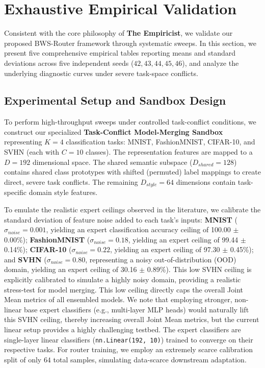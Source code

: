 \section{Exhaustive Empirical Validation}
\label{sec:experiments}

Consistent with the core philosophy of \textbf{The Empiricist}, we validate our proposed BWS-Router framework through systematic sweeps. In this section, we present five comprehensive empirical tables reporting means and standard deviations across five independent seeds ($42, 43, 44, 45, 46$), and analyze the underlying diagnostic curves under severe task-space conflicts.

\subsection{Experimental Setup and Sandbox Design}
To perform high-throughput sweeps under controlled task-conflict conditions, we construct our specialized \textbf{Task-Conflict Model-Merging Sandbox} representing $K=4$ classification tasks: MNIST, FashionMNIST, CIFAR-10, and SVHN (each with $C=10$ classes). The representation features are mapped to a $D=192$ dimensional space. The shared semantic subspace ($D_{shared} = 128$) contains shared class prototypes with shifted (permuted) label mappings to create direct, severe task conflicts. The remaining $D_{style} = 64$ dimensions contain task-specific domain style features.

To emulate the realistic expert ceilings observed in the literature, we calibrate the standard deviation of feature noise added to each task's inputs: \textbf{MNIST} ($\sigma_{noise} = 0.001$, yielding an expert classification accuracy ceiling of 100.00 $\pm$ 0.00\%); \textbf{FashionMNIST} ($\sigma_{noise} = 0.18$, yielding an expert ceiling of 99.44 $\pm$ 0.14\%); \textbf{CIFAR-10} ($\sigma_{noise} = 0.22$, yielding an expert ceiling of 97.30 $\pm$ 0.45\%); and \textbf{SVHN} ($\sigma_{noise} = 0.80$, representing a noisy out-of-distribution (OOD) domain, yielding an expert ceiling of 30.16 $\pm$ 0.89\%). This low SVHN ceiling is explicitly calibrated to simulate a highly noisy domain, providing a realistic stress-test for model merging. This low ceiling directly caps the overall Joint Mean metrics of all ensembled models. We note that employing stronger, non-linear base expert classifiers (e.g., multi-layer MLP heads) would naturally lift this SVHN ceiling, thereby increasing overall Joint Mean metrics, but the current linear setup provides a highly challenging testbed. The expert classifiers are single-layer linear classifiers (\texttt{nn.Linear(192, 10)}) trained to converge on their respective tasks. For router training, we employ an extremely scarce calibration split of only $64$ total samples, simulating data-scarce downstream adaptation.

